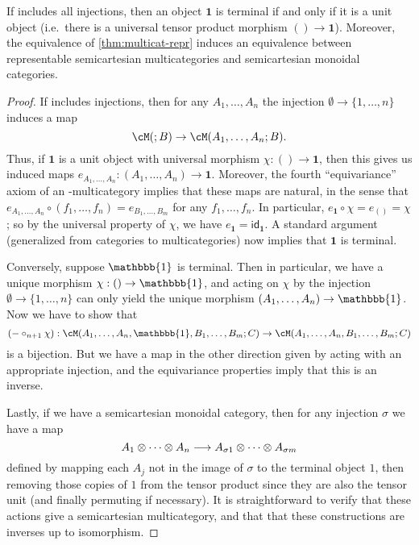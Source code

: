 \documentclass{book}
\def\idfunc{\mathsf{id}}
\def\unit{\mathbbb{1}}%
\def\one{\mathbf{1}}
\let\tensor\otimes
\begin{document}
\begin{thm}\label{thm:semicart-multicat-repr}
  If \fS includes all injections, then an object $\one$ is terminal if and only if it is a unit object (i.e.\ there is a universal tensor product morphism $()\to \one$).
  Moreover, the equivalence of \cref{thm:multicat-repr} induces an equivalence between representable semicartesian multicategories and semicartesian monoidal categories.
\end{thm}
\begin{proof}
  If \fS includes injections, then for any $A_1,\dots,A_n$ the injection $\emptyset \to \{1,\dots,n\}$ induces a map
  \[ \cM(;B) \to \cM(A_1,\dots,A_n;B). \]
  Thus, if $\one$ is a unit object with universal morphism $\chi:()\to \one$, then this gives us induced maps $e_{A_1,\dots,A_n}:(A_1,\dots,A_n) \to \one$.
  Moreover, the fourth ``equivariance'' axiom of an \fS-multicategory implies that these maps are natural, in the sense that
  $e_{A_1,\dots,A_n} \circ (f_1,\dots,f_n) = e_{B_1,\dots,B_m}$ for any $f_1,\dots,f_n$.
  In particular, $e_{\one} \circ \chi = e_{()} = \chi$; so by the universal property of $\chi$, we have $e_{\one} = \idfunc_{\one}$.
  A standard argument (generalized from categories to multicategories) now implies that $\one$ is terminal.

  Conversely, suppose $\unit$ is terminal.
  Then in particular, we have a unique morphism $\chi : ()\to \unit$, and acting on $\chi$ by the injection $\emptyset \to \{1,\dots,n\}$ can only yield the unique morphism $(A_1,\dots,A_n)\to \unit$.
  Now we have to show that
  \[ (-\circ_{n+1} \chi) : \cM(A_1,\dots,A_n,\unit,B_1,\dots,B_m; C) \to \cM(A_1,\dots,A_n,B_1,\dots,B_m; C) \]
  is a bijection.
  But we have a map in the other direction given by acting with an appropriate injection, and the equivariance properties imply that this is an inverse.

  Lastly, if we have a semicartesian monoidal category, then for any injection $\sigma$ we have a map
  \[ A_1\tensor \cdots\tensor A_n \too A_{\sigma 1} \tensor\dots\tensor A_{\sigma m} \]
  defined by mapping each $A_j$ not in the image of $\sigma$ to the terminal object $1$, then removing those copies of $1$ from the tensor product since they are also the tensor unit (and finally permuting if necessary).
  It is straightforward to verify that these actions give a semicartesian multicategory, and that that these constructions are inverses up to isomorphism.
\end{proof}
\end{document}
